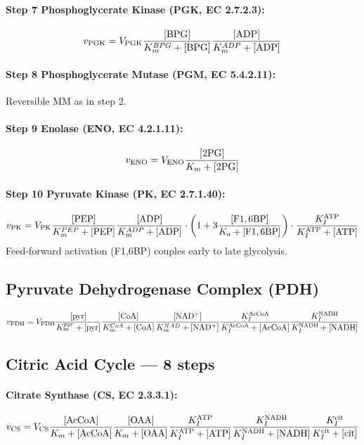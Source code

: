 \documentclass[11pt,a4paper]{article}
\newcommand{\eq}[1]{\begin{equation}#1\end{equation}}
\begin{document}
\paragraph{Step 7 Phosphoglycerate Kinase (PGK, EC 2.7.2.3):}
\eq{ v_{\rm PGK} = V_{\rm PGK}\frac{[\rm BPG]}{K_m^{BPG}+[\rm BPG]}\frac{[\rm ADP]}{K_m^{ADP}+[\rm ADP]} }

\paragraph{Step 8 Phosphoglycerate Mutase (PGM, EC 5.4.2.11):}
Reversible MM as in step 2.

\paragraph{Step 9 Enolase (ENO, EC 4.2.1.11):}
\eq{ v_{\rm ENO} = V_{\rm ENO}\frac{[\rm 2PG]}{K_m+[\rm 2PG]} }

\paragraph{Step 10 Pyruvate Kinase (PK, EC 2.7.1.40):}
\eq{ v_{\rm PK} = V_{\rm PK}\frac{[\rm PEP]}{K_m^{PEP}+[\rm PEP]}\frac{[\rm ADP]}{K_m^{ADP}+[\rm ADP]}\cdot\bigg(1+3\frac{[\rm F1,6BP]}{K_a+[\rm F1,6BP]}\bigg)\cdot\frac{K_I^{\rm ATP}}{K_I^{\rm ATP}+[\rm ATP]} }
Feed-forward activation (F1,6BP) couples early to late glycolysis.

\subsection{Pyruvate Dehydrogenase Complex (PDH)}
\eq{ v_{\rm PDH} = V_{\rm PDH}\frac{[\rm pyr]}{K_m^{pyr}+[\rm pyr]}\frac{[\rm CoA]}{K_m^{CoA}+[\rm CoA]}\frac{[\rm NAD^+]}{K_m^{NAD}+[\rm NAD^+]}\frac{K_I^{\rm AcCoA}}{K_I^{\rm AcCoA}+[\rm AcCoA]}\frac{K_I^{\rm NADH}}{K_I^{\rm NADH}+[\rm NADH]} }

\subsection{Citric Acid Cycle --- 8 steps}

\paragraph{Citrate Synthase (CS, EC 2.3.3.1):}
\eq{ v_{\rm CS} = V_{\rm CS}\frac{[\rm AcCoA]}{K_m+[\rm AcCoA]}\frac{[\rm OAA]}{K_m+[\rm OAA]}\frac{K_I^{\rm ATP}}{K_I^{\rm ATP}+[\rm ATP]}\frac{K_I^{\rm NADH}}{K_I^{\rm NADH}+[\rm NADH]}\frac{K_I^{\rm cit}}{K_I^{\rm cit}+[\rm cit]} }
\end{document}
